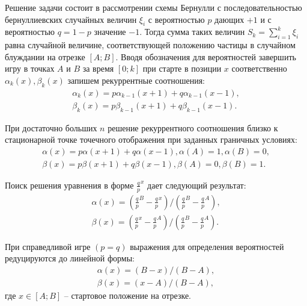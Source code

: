 Решение задачи состоит в рассмотрении схемы Бернулли с последовательностью бернуллиевских случайных величин $\xi_i$ с вероятностью $p$ дающих $+1$ и с вероятностью $q=1-p$ значение $-1$. Тогда сумма таких величин $S_k=\sum_{i=1}^{k} \xi_i$ равна случайной величине, соответствующей положению частицы в случайном блуждании на отрезке $[A; B]$. Вводя обозначения для вероятностей завершить игру в точках $A$ и $B$ за время $[0; k]$ при старте в позиции $x$ соответственно $\alpha_k(x), \beta_k(x)$ запишем рекуррентные соотношения:
\begin{equation}
    \label{eq:eq1}
    \begin{alignedat}{2}
        \alpha_k(x) = p\alpha_{k-1}(x+1)+q\alpha_{k-1}(x-1),\\
        \beta_k(x) = p\beta_{k-1}(x+1)+q\beta_{k-1}(x-1).
    \end{alignedat}
\end{equation}

При достаточно больших $n$ решение рекуррентного соотношения близко к стационарной точке точечного отображения при заданных граничных условиях:
\begin{equation}
    \label{eq:eq2}
    \begin{alignedat}{2}
        \alpha(x) = p\alpha(x+1)+q\alpha(x-1), \alpha(A)=1, \alpha(B)=0,\\
        \beta(x) = p\beta(x+1)+q\beta(x-1), \beta(A)=0, \beta(B)=1.
    \end{alignedat}
\end{equation}

Поиск решения уравнения в форме $\frac{q}{p}^{x}$ дает следующий результат:
\begin{equation}
    \label{eq:eq3}
    \begin{alignedat}{2}
        \alpha(x) = (\frac{q}{p}^B-\frac{q}{p}^x)/(\frac{q}{p}^B-\frac{q}{p}^A),\\
        \beta(x) = (\frac{q}{p}^x-\frac{q}{p}^A)/(\frac{q}{p}^B-\frac{q}{p}^A).
    \end{alignedat}
\end{equation}

При справедливой игре $(p=q)$ выражения для определения вероятностей редуцируются до линейной формы:
\begin{equation}
    \label{eq:eq4}
    \begin{alignedat}{2}
        \alpha(x) = (B-x)/(B-A),\\
        \beta(x) = (x-A)/(B-A),
    \end{alignedat}
\end{equation}
где $x \in [A; B]$ -- стартовое положение на отрезке.

